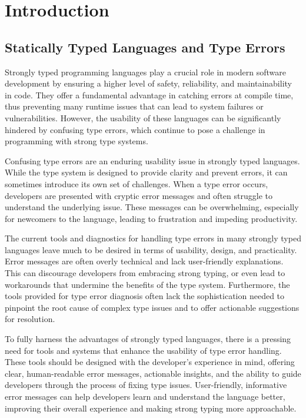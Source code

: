 
\chapter{Introduction}
\label{chapter1} 

\section{Statically Typed Languages and Type Errors}

Strongly typed programming languages play a crucial role in modern software development by ensuring a higher level of safety, reliability, and maintainability in code. They offer a fundamental advantage in catching errors at compile time, thus preventing many runtime issues that can lead to system failures or vulnerabilities. However, the usability of these languages can be significantly hindered by confusing type errors, which continue to pose a challenge in programming with strong type systems.

Confusing type errors are an enduring usability issue in strongly typed languages. While the type system is designed to provide clarity and prevent errors, it can sometimes introduce its own set of challenges. When a type error occurs, developers are presented with cryptic error messages and often struggle to understand the underlying issue. These messages can be overwhelming, especially for newcomers to the language, leading to frustration and impeding productivity.

The current tools and diagnostics for handling type errors in many strongly typed languages leave much to be desired in terms of usability, design, and practicality. Error messages are often overly technical and lack user-friendly explanations. This can discourage developers from embracing strong typing, or even lead to workarounds that undermine the benefits of the type system. Furthermore, the tools provided for type error diagnosis often lack the sophistication needed to pinpoint the root cause of complex type issues and to offer actionable suggestions for resolution.

To fully harness the advantages of strongly typed languages, there is a pressing need for tools and systems that enhance the usability of type error handling. These tools should be designed with the developer's experience in mind, offering clear, human-readable error messages, actionable insights, and the ability to guide developers through the process of fixing type issues. User-friendly, informative error messages can help developers learn and understand the language better, improving their overall experience and making strong typing more approachable.

